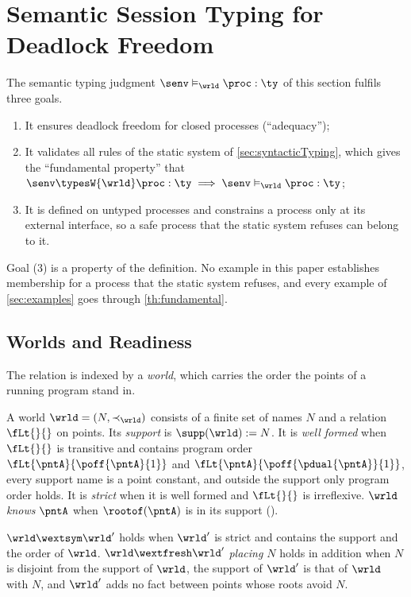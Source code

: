 \section{Semantic Session Typing for Deadlock Freedom}
\label{sec:logicalRelation}

The semantic typing judgment $\senv \proves_{\wrld} \proc : \ty$ of this
section fulfils three goals.
\begin{enumerate}[(1)]
  \item It ensures deadlock freedom for closed processes (``adequacy'');
  \item
    It validates all rules of the static system of
    \cref{sec:syntacticTyping}, which gives the ``fundamental property''
    that
    $
      \senv \typesW{\wrld} \proc : \ty
      \implies
      \senv \proves_{\wrld} \proc : \ty
    $;
  \item It is defined on untyped processes and constrains a process only
    at its external interface, so a safe process that the static system
    refuses can belong to it.
\end{enumerate}
Goal (3) is a property of the definition. No example in this paper
establishes membership for a process that the static system refuses, and
every example of \cref{sec:examples} goes through
\cref{th:fundamental}.


\subsection{Worlds and Readiness}
\label{sec:worlds}

The relation is indexed by a \emph{world}, which carries the order the
points of a running program stand in.

\begin{definition}
\label{def:world}
  A world $\wrld = (N,{\prec}_{\wrld})$ consists of a finite set of
  names $N$ and a relation $\fLt{}{}$ on points.
  Its \emph{support} is $\supp(\wrld) := N$. It is
  \emph{well formed} when $\fLt{}{}$ is transitive and contains program
  order $\fLt{\pntA}{\poff{\pntA}{1}}$ and
  $\fLt{\pntA}{\poff{\pdual{\pntA}}{1}}$, every support name is a point
  constant, and outside the support only program order holds. It is \emph{strict} when it is well formed and $\fLt{}{}$ is
  irreflexive.
  $\wrld$ \emph{knows} $\pntA$ when $\rootof(\pntA)$ is in its support
  ().
\end{definition}

\begin{definition}
\label{def:wext}
  $\wrld \wextsym \wrld'$ holds when $\wrld'$ is strict and contains the
  support and the order of $\wrld$.
  $\wrld \wextfresh \wrld'$ \emph{placing $N$} holds in addition when
  $N$ is disjoint from the support of $\wrld$, the support of $\wrld'$
  is that of $\wrld$ with $N$, and $\wrld'$ adds no fact between points
  whose roots avoid $N$.
\end{definition}

